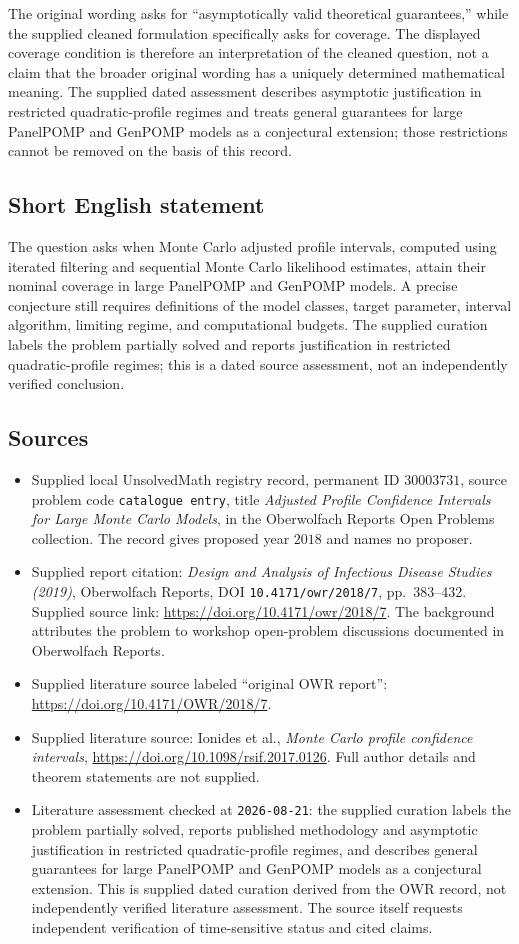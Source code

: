 \documentclass[11pt]{article}
\begin{document}
The original wording asks for ``asymptotically valid theoretical guarantees,'' while the supplied cleaned formulation specifically asks for coverage. The displayed coverage condition is therefore an interpretation of the cleaned question, not a claim that the broader original wording has a uniquely determined mathematical meaning. The supplied dated assessment describes asymptotic justification in restricted quadratic-profile regimes and treats general guarantees for large PanelPOMP and GenPOMP models as a conjectural extension; those restrictions cannot be removed on the basis of this record.
\subsection{Short English statement}
The question asks when Monte Carlo adjusted profile intervals, computed using iterated filtering and sequential Monte Carlo likelihood estimates, attain their nominal coverage in large PanelPOMP and GenPOMP models. A precise conjecture still requires definitions of the model classes, target parameter, interval algorithm, limiting regime, and computational budgets. The supplied curation labels the problem partially solved and reports justification in restricted quadratic-profile regimes; this is a dated source assessment, not an independently verified conclusion.
\subsection{Sources}
\begin{itemize}
\item Supplied local UnsolvedMath registry record, permanent ID \(30003731\), source problem code \texttt{catalogue entry}, title \emph{Adjusted Profile Confidence Intervals for Large Monte Carlo Models}, in the Oberwolfach Reports Open Problems collection. The record gives proposed year \(2018\) and names no proposer.
\item Supplied report citation: \emph{Design and Analysis of Infectious Disease Studies (2019)}, Oberwolfach Reports, DOI \texttt{10.4171/owr/2018/7}, pp.\ 383--432. Supplied source link: \url{https://doi.org/10.4171/owr/2018/7}. The background attributes the problem to workshop open-problem discussions documented in Oberwolfach Reports.
\item Supplied literature source labeled ``original OWR report'': \url{https://doi.org/10.4171/OWR/2018/7}.
\item Supplied literature source: Ionides et al., \emph{Monte Carlo profile confidence intervals}, \url{https://doi.org/10.1098/rsif.2017.0126}. Full author details and theorem statements are not supplied.
\item Literature assessment checked at \texttt{2026-08-21}: the supplied curation labels the problem partially solved, reports published methodology and asymptotic justification in restricted quadratic-profile regimes, and describes general guarantees for large PanelPOMP and GenPOMP models as a conjectural extension. This is supplied dated curation derived from the OWR record, not independently verified literature assessment. The source itself requests independent verification of time-sensitive status and cited claims.
\end{itemize}
\end{document}
